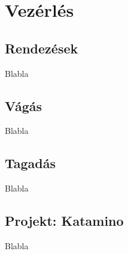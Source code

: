 \chapter{Vezérlés}
\section{Rendezések}
Blabla
\section{Vágás}
Blabla
\section{Tagadás}
Blabla
\section{Projekt: Katamino}
Blabla
